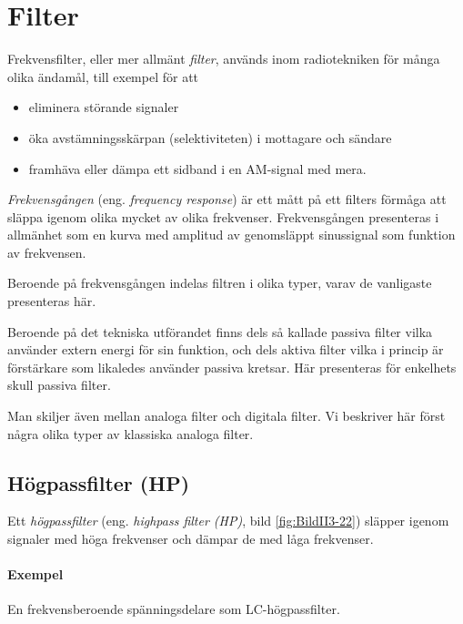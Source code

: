 \section{Filter}
\label{filter}

Frekvensfilter, eller mer allmänt \emph{filter}, används inom radiotekniken för
många olika ändamål, till exempel för att
\begin{itemize}
  \item eliminera störande signaler
  \item öka avstämningsskärpan (selektiviteten) i mottagare och sändare
  \item framhäva eller dämpa ett sidband i en AM-signal med mera.
\end{itemize}

\emph{Frekvensgången} (eng. \emph{frequency response}) är ett mått på ett
filters förmåga att släppa igenom olika mycket av olika frekvenser.
Frekvensgången presenteras i allmänhet som en kurva med amplitud av genomsläppt
sinussignal som funktion av frekvensen.

Beroende på frekvensgången indelas filtren i olika typer, varav de vanligaste presenteras här.

Beroende på det tekniska utförandet finns dels så kallade passiva filter vilka
använder extern energi för sin funktion, och dels aktiva filter vilka i princip
är förstärkare som likaledes använder passiva kretsar.
Här presenteras för enkelhets skull passiva filter.

Man skiljer även mellan analoga filter och digitala filter. Vi beskriver här först några olika typer av klassiska analoga filter.

\subsection{Högpassfilter (HP)}



Ett \emph{högpassfilter} (eng. \emph{highpass filter (HP)}, bild \ref{fig:BildII3-22}) släpper igenom
signaler med höga frekvenser och dämpar de med låga frekvenser.

\paragraph{Exempel} En frekvensberoende spänningsdelare som LC-högpassfilter.

